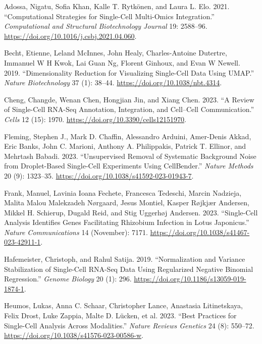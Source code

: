 \documentclass[
  letterpaper,
  DIV=11,
  numbers=noendperiod]{scrartcl}
\newlength{\cslhangindent}
\newenvironment{CSLReferences}[2] %
 {\begin{list}{}{%
  \setlength{\itemindent}{0pt}
  \setlength{\leftmargin}{0pt}
  \setlength{\parsep}{0pt}
  \ifodd #1
   \setlength{\leftmargin}{\cslhangindent}
   \setlength{\itemindent}{-1\cslhangindent}
  \fi
  \setlength{\itemsep}{#2\baselineskip}}}
 {\end{list}}
\begin{document}
\label{refs}
\begin{CSLReferences}{1}{0}
Adossa, Nigatu, Sofia Khan, Kalle T. Rytkönen, and Laura L. Elo. 2021.
{``Computational Strategies for Single-Cell Multi-Omics Integration.''}
\emph{Computational and Structural Biotechnology Journal} 19: 2588--96.
\url{https://doi.org/10.1016/j.csbj.2021.04.060}.

Becht, Etienne, Leland McInnes, John Healy, Charles-Antoine Dutertre,
Immanuel W H Kwok, Lai Guan Ng, Florent Ginhoux, and Evan W Newell.
2019. {``Dimensionality Reduction for Visualizing Single-Cell Data Using
{UMAP}.''} \emph{Nature Biotechnology} 37 (1): 38--44.
\url{https://doi.org/10.1038/nbt.4314}.

Cheng, Changde, Wenan Chen, Hongjian Jin, and Xiang Chen. 2023. {``A
{Review} of {Single}-{Cell} {RNA}-{Seq} {Annotation}, {Integration}, and
{Cell}--{Cell} {Communication}.''} \emph{Cells} 12 (15): 1970.
\url{https://doi.org/10.3390/cells12151970}.

Fleming, Stephen J., Mark D. Chaffin, Alessandro Arduini, Amer-Denis
Akkad, Eric Banks, John C. Marioni, Anthony A. Philippakis, Patrick T.
Ellinor, and Mehrtash Babadi. 2023. {``Unsupervised Removal of
Systematic Background Noise from Droplet-Based Single-Cell Experiments
Using {CellBender}.''} \emph{Nature Methods} 20 (9): 1323--35.
\url{https://doi.org/10.1038/s41592-023-01943-7}.

Frank, Manuel, Lavinia Ioana Fechete, Francesca Tedeschi, Marcin
Nadzieja, Malita Malou Malekzadeh Nørgaard, Jesus Montiel, Kasper
Røjkjær Andersen, Mikkel H. Schierup, Dugald Reid, and Stig Uggerhøj
Andersen. 2023. {``Single-Cell Analysis Identifies Genes Facilitating
Rhizobium Infection in {Lotus} Japonicus.''} \emph{Nature
Communications} 14 (November): 7171.
\url{https://doi.org/10.1038/s41467-023-42911-1}.

Hafemeister, Christoph, and Rahul Satija. 2019. {``Normalization and
Variance Stabilization of Single-Cell {RNA}-Seq Data Using Regularized
Negative Binomial Regression.''} \emph{Genome Biology} 20 (1): 296.
\url{https://doi.org/10.1186/s13059-019-1874-1}.

Heumos, Lukas, Anna C. Schaar, Christopher Lance, Anastasia
Litinetskaya, Felix Drost, Luke Zappia, Malte D. Lücken, et al. 2023.
{``Best Practices for Single-Cell Analysis Across Modalities.''}
\emph{Nature Reviews Genetics} 24 (8): 550--72.
\url{https://doi.org/10.1038/s41576-023-00586-w}.


\end{CSLReferences}
\end{document}
